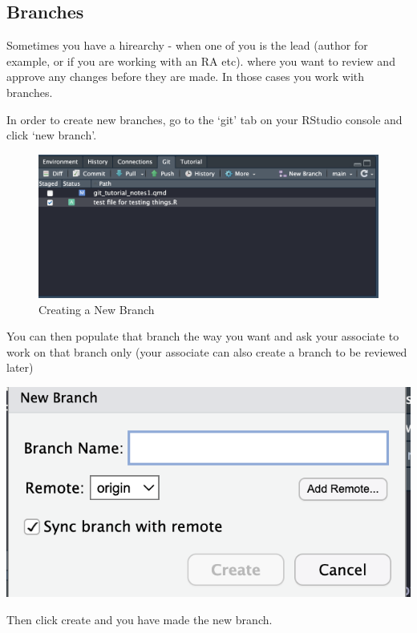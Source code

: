 \documentclass[
  letterpaper,
  DIV=11,
  numbers=noendperiod]{scrartcl}
\begin{document}
\hypertarget{branches}{%
\subsection{Branches}\label{branches}}

Sometimes you have a hirearchy - when one of you is the lead (author for
example, or if you are working with an RA etc). where you want to review
and approve any changes before they are made. In those cases you work
with branches.

In order to create new branches, go to the `git' tab on your RStudio
console and click `new branch'.

\begin{figure}

{\centering \includegraphics{figures/16.5.png}

}

\caption{Creating a New Branch}

\end{figure}

You can then populate that branch the way you want and ask your
associate to work on that branch only (your associate can also create a
branch to be reviewed later)

\includegraphics{figures/17.png}

Then click create and you have made the new branch.
\end{document}
